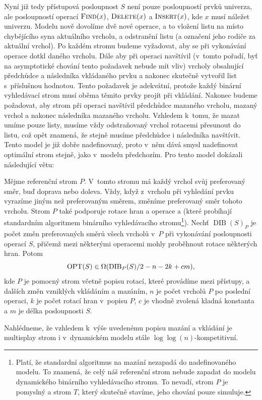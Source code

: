 Nyní již tedy přístupová posloupnost $S$ není pouze posloupností prvků
univerza, ale posloupností operací $\ope{Find}(x)$, $\ope{Delete}(x)$ a
$\ope{Insert}(x)$, kde $x$ musí náležet univerzu. Modelu nově dovolíme dvě
nové operace, a to vložení listu na místo chybějícího syna aktuálního vrcholu,
a odstranění listu (a označení jeho rodiče za aktuální vrchol). Po každém
stromu budeme vyžadovat, aby se při vykonávání operace  dotkl daného
vrcholu. Dále aby při operaci  navštívil (v~tomto pořadí, byť na
asymptotické chování tento požadavek nebude mít vliv) vrcholy obsahující
předchůdce a následníka vkládaného prvku a nakonec skutečně vytvořil list
s~příslušnou hodnotou. Tento požadavek je adekvátní, protože každý binární
vyhledávací strom musí oběma těmito prvky projít při vkládání. Nakonec budeme
požadovat, aby strom při operaci  navštívil předchůdce mazaného
vrcholu, mazaný vrchol a nakonec následníka mazaného vrcholu. Vzhledem k~tomu,
že mazat umíme pouze listy, musíme vždy odstraňovaný vrchol rotacemi přesunout
do listu, což opět znamená, že stejně musíme předchůdce i následníka navštívit.
Tento model je již dobře nadefinovaný, proto v~něm dává smysl nadefinovat optimální strom stejně, jako v~modelu předchozím.
Pro tento model \citet{multisplay} dokázali následující větu:

\begin{veta}
\def\dib{\operatorname{DIB}}
Mějme referenční strom $P$. V~tomto stromu má každý vrchol svůj preferovaný
směr, buď doprava nebo doleva. Vždy, když z~vrcholu při vyhledání prvku vyrazíme
jiným než preferovaným směrem, změníme preferovaný směr tohoto vrcholu. Strom
$P$ také podporuje rotace hran a operace  a  (které
probíhají standardním algoritmem binárního vyhledávacího stromu\footnote{Platí,
že standardní algoritmus na mazání nezapadá do nadefinovaného modelu. To
znamená, že celý náš referenční strom nebude zapadat do modelu dynamického
binárního vyhledávacího stromu. To nevadí, strom $P$ je pomyslný a strom
$T$, který skutečně stavíme, jeho chování pouze simuluje.}). Nechť $\dib(S)_P$ je
počet změn preferovaných směrů všech vrcholů v~$P$ při vykonávání posloupnosti
operací $S$, přičemž mezi některými operacemi mohly proběhnout rotace některých
hran. Potom $$\opt(S) \in \Omega(\dib_P(S)/2 - n - 2k + cm),$$ kde $P$ je
pomocný strom včetně popisu rotací, které provádíme mezi přístupy, a dalších
změn vzniklých vkládáním a mazáním, $n$ je počet vrcholů $P$ po poslední operaci, $k$
je počet rotací hran v~popisu $P$, $c$ je vhodně zvolená kladná konstanta a $m$
je délka posloupnosti $S$.  \end{veta}

Nahlédneme, že vzhledem k~výše uvedenému popisu mazání a vkládání je multisplay strom i v~dynamickém modelu stále $\log\log(n)$-kompetitivní. 

